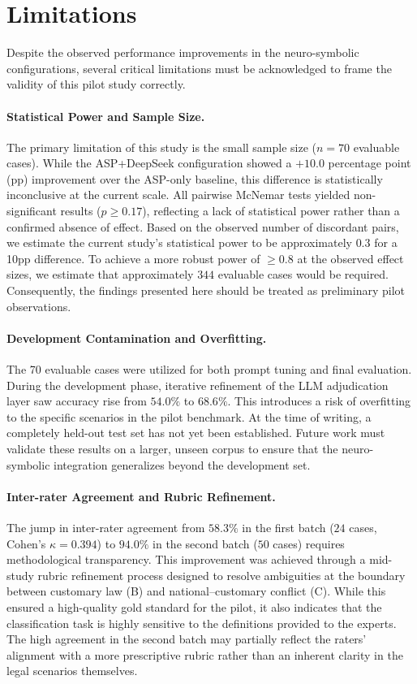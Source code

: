 \documentclass[11pt]{article}
\begin{document}
\section{Limitations}
\label{sec:limitations}

Despite the observed performance improvements in the neuro-symbolic configurations, several critical limitations must be acknowledged to frame the validity of this pilot study correctly.

\paragraph{Statistical Power and Sample Size.}
The primary limitation of this study is the small sample size ($n=70$ evaluable cases). While the ASP+DeepSeek configuration showed a $+10.0$ percentage point (pp) improvement over the ASP-only baseline, this difference is statistically inconclusive at the current scale. All pairwise McNemar tests yielded non-significant results ($p \geq 0.17$), reflecting a lack of statistical power rather than a confirmed absence of effect. Based on the observed number of discordant pairs, we estimate the current study's statistical power to be approximately $0.3$ for a 10pp difference. To achieve a more robust power of $\geq 0.8$ at the observed effect sizes, we estimate that approximately $344$ evaluable cases would be required. Consequently, the findings presented here should be treated as preliminary pilot observations.

\paragraph{Development Contamination and Overfitting.}
The 70 evaluable cases were utilized for both prompt tuning and final evaluation. During the development phase, iterative refinement of the LLM adjudication layer saw accuracy rise from $54.0\%$ to $68.6\%$. This introduces a risk of overfitting to the specific scenarios in the pilot benchmark. At the time of writing, a completely held-out test set has not yet been established. Future work must validate these results on a larger, unseen corpus to ensure that the neuro-symbolic integration generalizes beyond the development set.

\paragraph{Inter-rater Agreement and Rubric Refinement.}
The jump in inter-rater agreement from $58.3\%$ in the first batch ($24$ cases, Cohen's $\kappa = 0.394$) to $94.0\%$ in the second batch ($50$ cases) requires methodological transparency. This improvement was achieved through a mid-study rubric refinement process designed to resolve ambiguities at the boundary between customary law (B) and national--customary conflict (C). While this ensured a high-quality gold standard for the pilot, it also indicates that the classification task is highly sensitive to the definitions provided to the experts. The high agreement in the second batch may partially reflect the raters' alignment with a more prescriptive rubric rather than an inherent clarity in the legal scenarios themselves.
\end{document}
